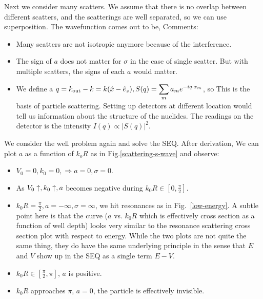 \documentclass{school-22.101-notes}
\begin{document}
Next we consider many scatters. We assume that there is no overlap between different scatters, and the scatterings are well separated, so we can use superposition. The wavefunction comes out to be,
Comments: 
\begin{itemize}
\item Many scatters are not isotropic anymore because of the interference. 
\item The sign of $a$ does not matter for $\sigma$ in the case of single scatter. But with multiple scatters, the signs of each $a$ would matter. 
\item We define a $\displaystyle q = k_{\mathrm{out}} - k = k(\hat{x} - \hat{e}_z), S(q) = \displaystyle\sum_m a_m e^{-i q \cdot x_m}$, so 
  This is the basis of particle scattering. Setting up detectors at different location would tell us information about the structure of the nuclides. The readings on the detector is the intensity $I(q) \propto |S(q)|^2$. 
\end{itemize}
We consider the well problem again and solve the SEQ. After derivation,  
We can plot $a$ as a function of $k_o R$ as in Fig.\ref{scattering-s-wave} and observe:
\begin{itemize}
\item $V_0 = 0, k_0 = 0, \Rightarrow a= 0 ,\sigma = 0$. 
\item As $V_0 \uparrow, k_0 \uparrow, a$ becomes negative during $\displaystyle k_0 R \in \left[0, \frac{\pi}{2} \right]$. 
\item $k_0 R = \frac{\pi}{2}, a = -\infty, \sigma = \infty$, we hit resonances as in Fig.~\ref{low-energy}. A subtle point here is that the curve ($a$ vs. $k_0 R$ which is effectively cross section as a function of well depth) looks very similar to the resonance scattering cross section plot with respect to energy. While the two plots are not quite the same thing, they do have the same underlying principle in the sense that $E$ and $V$ show up in the SEQ as a single term $E-V$.  
\item $k_0 R \in [\frac{\pi}{2}, \pi]$, $a$ is positive. 
\item $k_0 R$ approaches $\pi$, $a = 0$, the particle is effectively invisible. 
\end{itemize}
\end{document}
